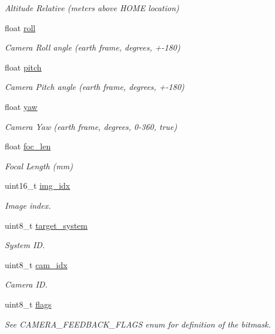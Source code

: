 \begin{DoxyCompactItemize}
\begin{DoxyCompactList}\small\item\em Altitude Relative (meters above H\+O\+M\+E location) \end{DoxyCompactList}\item 
float \hyperlink{struct____mavlink__camera__feedback__t_a72bb9c942427644c1b8184316057c8ed}{roll}
\begin{DoxyCompactList}\small\item\em Camera Roll angle (earth frame, degrees, +-\/180) \end{DoxyCompactList}\item 
float \hyperlink{struct____mavlink__camera__feedback__t_a026bd6f65ad9a56b5fcc0518f9b58a18}{pitch}
\begin{DoxyCompactList}\small\item\em Camera Pitch angle (earth frame, degrees, +-\/180) \end{DoxyCompactList}\item 
float \hyperlink{struct____mavlink__camera__feedback__t_a49cedce2e036818b2bf6189f02bf652f}{yaw}
\begin{DoxyCompactList}\small\item\em Camera Yaw (earth frame, degrees, 0-\/360, true) \end{DoxyCompactList}\item 
float \hyperlink{struct____mavlink__camera__feedback__t_a5e8c2ff6273df6d7aa5dce8f0c286d98}{foc\+\_\+len}
\begin{DoxyCompactList}\small\item\em Focal Length (mm) \end{DoxyCompactList}\item 
uint16\+\_\+t \hyperlink{struct____mavlink__camera__feedback__t_a7046cdcda0647a8196f095df725f8379}{img\+\_\+idx}
\begin{DoxyCompactList}\small\item\em Image index. \end{DoxyCompactList}\item 
uint8\+\_\+t \hyperlink{struct____mavlink__camera__feedback__t_a0906a3aa87c2534c80bc6f9be921c7d3}{target\+\_\+system}
\begin{DoxyCompactList}\small\item\em System I\+D. \end{DoxyCompactList}\item 
uint8\+\_\+t \hyperlink{struct____mavlink__camera__feedback__t_aca9f2e031d88e805f6b478317e85c0e1}{cam\+\_\+idx}
\begin{DoxyCompactList}\small\item\em Camera I\+D. \end{DoxyCompactList}\item 
uint8\+\_\+t \hyperlink{struct____mavlink__camera__feedback__t_a61d934ad402ebb8427cdd640d74f2e44}{flags}
\begin{DoxyCompactList}\small\item\em See C\+A\+M\+E\+R\+A\+\_\+\+F\+E\+E\+D\+B\+A\+C\+K\+\_\+\+F\+L\+A\+G\+S enum for definition of the bitmask. \end{DoxyCompactList}\end{DoxyCompactItemize}


